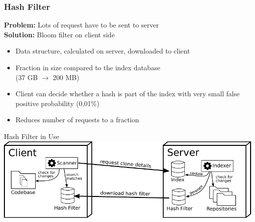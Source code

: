 \subsubsection{Hash Filter}
\begin{frame}{\insertsubsection}{\insertsubsubsection}
	\textbf{Problem:} Lots of request have to be sent to server\\
	\pause
	\vspace{2mm}
	\textbf{Solution:} Bloom filter on client side
	\vspace{2mm}
	\begin{itemize}
		\small
		\item Data structure, calculated on server, downloaded to client
		\item Fraction in size compared to the index database\\ (37 GB $\rightarrow$ 200 MB)
		\item Client can decide whether a hash is part of the index with very small false positive probability (0,01\%)
		\item Reduces number of requests to a fraction
	\end{itemize}

\end{frame}

\begin{frame}{\insertsubsection}{Hash Filter in Use}
	\includegraphics[width=\linewidth]{../written/figures/architecture_overview.pdf}
\end{frame}

